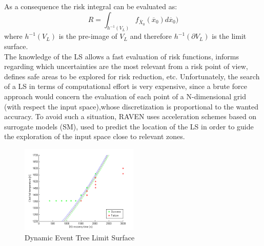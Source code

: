 \documentclass{anstrans}
\begin{document}
As a consequence the risk integral can be evaluated as:
\begin{equation} 
R=\int_{h^{-1}(V_{L})} f _{\overline{X}_{0}}(\overline{x}_{0})d\overline{x}_{0})
\end{equation}
where $h^{-1}(V_{L})$ is the pre-image of $V_{L}$ and therefore $h^{-1}(\partial V_{L})$ is the limit surface.
\\
The knowledge of the LS allows a fast evaluation of risk functions, informs regarding which uncertainties are the most relevant from a risk point of view, defines safe areas to be explored for risk reduction, etc. Unfortunately, the search of a LS in terms of computational effort is very expensive, since a brute force approach would concern the evaluation of each point of a N-dimensional grid (with respect the input space),whose discretization is proportional to the wanted accuracy.
To avoid such a situation, RAVEN uses acceleration schemes based on surrogate models (SM), used to predict the location of the LS in order to guide the exploration of the input space close to relevant zones. 

\begin{figure} 
  \centering
     \includegraphics[width=0.5\textwidth]{DET_LS_pb.png}
  \caption{Dynamic Event Tree Limit Surface}
  \label{fig:LSDET}
\end{figure}

\end{document}
